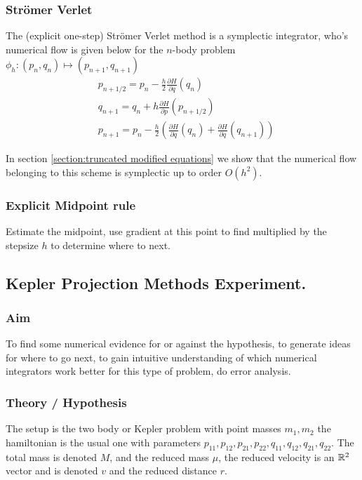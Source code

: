 \documentclass[12pt]{article}
\begin{document}
\subsubsection{Str\"omer Verlet}
The (explicit one-step) Str\"omer Verlet method is a symplectic integrator, who's numerical flow is given below for the $n$-body problem $\phi_h : (p_n,q_n)\mapsto (p_{n+1},q_{n+1})$
\begin{equation}\label{eq:stromer verlet n body}
\begin{split}
    & p_{n+1/2} = p_n - \frac{h}{2}\frac{\partial H}{\partial q}(q_n)\\
    & q_{n+1} = q_n + h \frac{\partial H}{\partial p}(p_{n+1/2})\\
    & p_{n+1} = p_n - \frac{h}{2}\left( \frac{\partial H}{\partial q}(q_n) + \frac{\partial H}{\partial q}(q_{n+1}) \right)
\end{split}
\end{equation}

In section \ref{section:truncated modified equations} we show that the numerical flow belonging to this scheme is symplectic up to order $O(h^2)$. 

\subsubsection{Explicit Midpoint rule}
Estimate the midpoint, use gradient at this point to find multiplied by the stepsize $h$ to determine where to next.




\subsection{Kepler Projection Methods Experiment.}
\subsubsection{Aim}
To find some numerical evidence for or against the hypothesis, to generate ideas for where to go next, to gain intuitive understanding of which numerical integrators work better for this type of problem, do error analysis. 

\subsubsection{Theory / Hypothesis}

The setup is the two body or Kepler problem with point masses $m_1,m_2$ the hamiltonian is the usual one with parameters $p_{11},p_{12},p_{21},p_{22},q_{11},q_{12},q_{21},q_{22}$. The total mass is denoted $M$, and the reduced mass $\mu$, the reduced velocity is an $\mathbb{R}^2$ vector and is denoted $v$ and the reduced distance $r$. 
\end{document}
